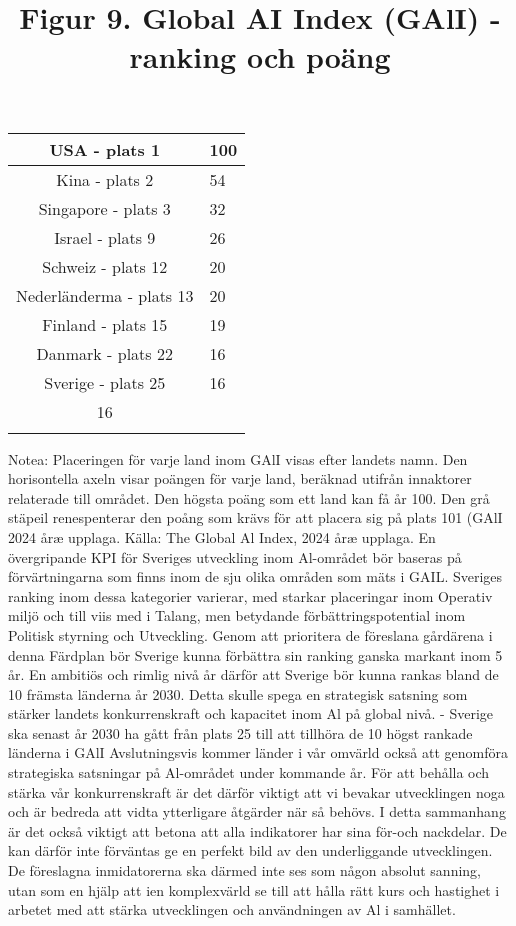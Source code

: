 {{{{{\title{
Figur 9. Global AI Index (GAlI) - ranking och poäng
}
\begin{tabular}{|c|c|c|c|c|c|c|}
\hline USA - plats 1 & \multicolumn{6}{|l|}{100} \\
\hline Kina - plats 2 & \multicolumn{6}{|l|}{54} \\
\hline Singapore - plats 3 & \multicolumn{6}{|l|}{32} \\
\hline Israel - plats 9 & \multicolumn{6}{|l|}{26} \\
\hline Schweiz - plats 12 & \multicolumn{6}{|l|}{20} \\
\hline Nederländerma - plats 13 & \multicolumn{6}{|l|}{20} \\
\hline Finland - plats 15 & \multicolumn{6}{|l|}{19} \\
\hline Danmark - plats 22 & \multicolumn{6}{|l|}{16} \\
\hline Sverige - plats 25 & \multicolumn{6}{|l|}{16} \\
\hline \multicolumn{6}{|c|}{16} \\
\hline \multicolumn{6}{|c|}{} \\
\hline
\end{tabular}
Notea: Placeringen för varje land inom GAlI visas efter landets namn. Den horisontella axeln visar poängen för varje land, beräknad utifrån innaktorer relaterade till området. Den högsta poäng som ett land kan få år 100. Den grå stäpeil renespenterar den poång som krävs för att placera sig på plats 101 (GAlI 2024 åræ upplaga.
Källa: The Global Al Index, 2024 åræ upplaga.
En övergripande KPI för Sveriges utveckling inom Al-området bör baseras på förvärtningarna som finns inom de sju olika områden som mäts i GAIL. Sveriges ranking inom dessa kategorier varierar, med starkar placeringar inom Operativ miljö och till viis med i Talang, men betydande förbättringspotential inom Politisk styrning och Utveckling. Genom att prioritera de föreslana gårdärena i denna Färdplan bör Sverige kunna förbättra sin ranking ganska markant inom 5 år. En ambitiös och rimlig nivå år därför att Sverige bör kunna rankas bland de 10 främsta länderna år 2030. Detta skulle spega en strategisk satsning som stärker landets konkurrenskraft och kapacitet inom Al på global nivå.
- Sverige ska senast år 2030 ha gått från plats 25 till att tillhöra de 10 högst rankade länderna i GAlI
Avslutningsvis kommer länder i vår omvärld också att genomföra strategiska satsningar på Al-området under kommande år. För att behålla och stärka vår konkurrenskraft är det därför viktigt att vi bevakar utvecklingen noga och är bedreda att vidta ytterligare åtgärder när så behövs. I detta sammanhang är det också viktigt att betona att alla indikatorer har sina för-och nackdelar. De kan därför inte förväntas ge en perfekt bild av den underliggande utvecklingen. De föreslagna inmidatorerna ska därmed inte ses som någon absolut sanning, utan som en hjälp att ien komplexvärld se till att hålla rätt kurs och hastighet i arbetet med att stärka utvecklingen och användningen av Al i samhället.

}}}}}
